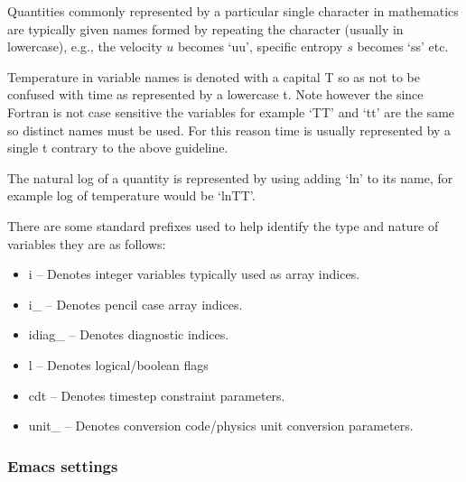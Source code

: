\documentclass[\mydriver,12pt,twoside,notitlepage,a4paper]{article}
\begin{document}
Quantities commonly represented by a particular single character
in mathematics are typically given names formed by repeating the
character (usually in lowercase), e.g., the velocity $u$ becomes `uu',
specific entropy $s$ becomes `ss' etc.

Temperature in variable names is denoted with a capital T so as not to
be confused with time as represented by a lowercase t.  Note however the
since Fortran is not case sensitive the variables for example `TT' and
`tt' are the same so distinct names must be used. For this reason time is
usually represented by a single t contrary to the above guideline.

The natural log of a quantity is represented by using adding `ln' to its
name, for example log of temperature would be `lnTT'.

There are some standard prefixes used to help identify the type and nature
of variables they are as follows:
\begin{itemize}
\item i -- Denotes integer variables typically used as array indices.
\item i_ -- Denotes pencil case array indices.
\item idiag_ -- Denotes diagnostic indices.
\item l -- Denotes logical/boolean flags
\item cdt -- Denotes timestep constraint parameters.
\item unit_ -- Denotes conversion code/physics unit conversion parameters.
\end{itemize}

\subsubsection{Emacs settings}
\end{document}
